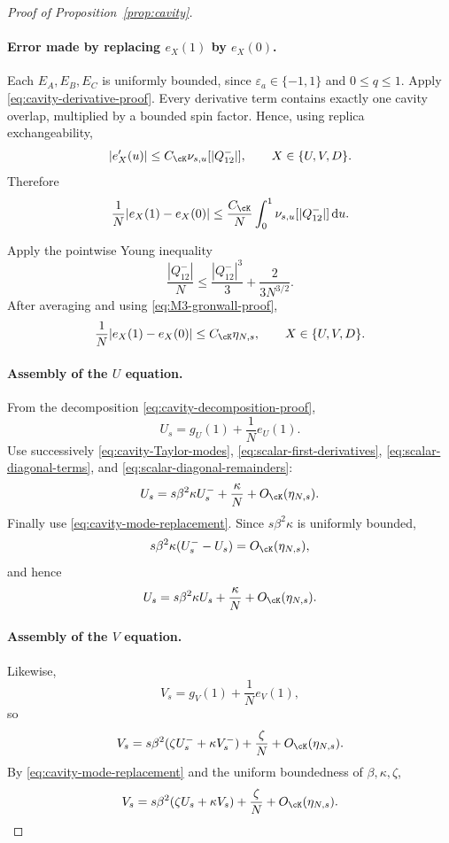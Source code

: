 \begin{proof}[Proof of Proposition~\ref{prop:cavity}]
\paragraph{Error made by replacing $e_X(1)$ by $e_X(0)$.}

Each $E_A,E_B,E_C$ is uniformly bounded, since
$\varepsilon_a\in\{-1,1\}$ and $0\le q\le1$.
Apply \eqref{eq:cavity-derivative-proof}.  Every derivative term contains
exactly one cavity overlap, multiplied by a bounded spin factor.  Hence,
using replica exchangeability,
\[
 |e_X'(u)|
 \le
 C_{\cK}\nu_{s,u}[|Q^-_{12}|],
 \qquad
 X\in\{U,V,D\}.
\]
Therefore
\[
 \frac1N|e_X(1)-e_X(0)|
 \le
 \frac{C_{\cK}}N
 \int_0^1
 \nu_{s,u}[|Q^-_{12}|]\,\mathrm du.
\]

Apply the pointwise Young inequality
\[
 \frac{|Q^-_{12}|}{N}
 \le
 \frac{|Q^-_{12}|^3}{3}
 +\frac{2}{3N^{3/2}}.
\]
After averaging and using \eqref{eq:M3-gronwall-proof},
\begin{equation}
 \frac1N|e_X(1)-e_X(0)|
 \le
 C_{\cK}\eta_{N,s},
 \qquad X\in\{U,V,D\}.
 \label{eq:scalar-diagonal-remainders}
\end{equation}

\paragraph{Assembly of the $U$ equation.}

From the decomposition
\eqref{eq:cavity-decomposition-proof},
\[
 U_s
 =
 g_U(1)+\frac1N e_U(1).
\]
Use successively
\eqref{eq:cavity-Taylor-modes},
\eqref{eq:scalar-first-derivatives},
\eqref{eq:scalar-diagonal-terms},
and \eqref{eq:scalar-diagonal-remainders}:
\[
 U_s
 =
 s\beta^2\kappa U_s^-
 +\frac{\kappa}{N}
 +O_{\cK}(\eta_{N,s}).
\]
Finally use \eqref{eq:cavity-mode-replacement}.  Since
$s\beta^2\kappa$ is uniformly bounded,
\[
 s\beta^2\kappa(U_s^--U_s)
 =
 O_{\cK}(\eta_{N,s}),
\]
and hence
\begin{equation}
 U_s
 =
 s\beta^2\kappa U_s
 +\frac{\kappa}{N}
 +O_{\cK}(\eta_{N,s}).
 \label{eq:assembled-U}
\end{equation}

\paragraph{Assembly of the $V$ equation.}

Likewise,
\[
 V_s
 =
 g_V(1)+\frac1N e_V(1),
\]
so
\[
 V_s
 =
 s\beta^2(\zeta U_s^-+\kappa V_s^-)
 +\frac{\zeta}{N}
 +O_{\cK}(\eta_{N,s}).
\]
By \eqref{eq:cavity-mode-replacement} and the uniform boundedness of
$\beta,\kappa,\zeta$,
\begin{equation}
 V_s
 =
 s\beta^2(\zeta U_s+\kappa V_s)
 +\frac{\zeta}{N}
 +O_{\cK}(\eta_{N,s}).
 \label{eq:assembled-V}
\end{equation}


\end{proof}
